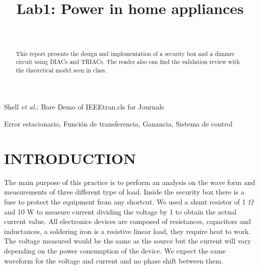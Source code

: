 \documentclass[journal]{IEEEtran}
\begin{document}
\title{\textbf{Lab1: Power in home appliances}}
\author{
  \\
}

%
{Shell \MakeLowercase{\textit{et al.}}: Bare Demo of IEEEtran.cls 
for Journals}
	
\maketitle

\begin{abstract}
This report presents the design and implementation of a security box 
and a dimmer circuit using DIACs and TRIACs. The reader also can find 
the validation review with the theoretical model seen in class.    
\end{abstract}


\begin{IEEEkeywords}  
Error estacionario, Funci\'on de transferencia, 
Ganancia, Sistema de control  
\end{IEEEkeywords}


\IEEEpeerreviewmaketitle

\section{INTRODUCTION}

The main purpose of this practice is to perform an analysis on the 
wave form and measurements of three different type of load. Inside the 
security box there is a fuse to protect the equipment from any 
shortcut. We used a shunt resistor of 1 $\Omega$ and 10 W to measure 
current dividing the voltage by 1 to obtain the actual current value.
All electronics devices are composed of resistances, capacitors and 
inductances, a soldering iron is a resistive linear load, they require 
heat to work. The voltage measured would be the same as the source but 
the current will vary depending on the power consumption of the 
device. We expect the same waveform for the voltage and current and no 
phase shift between them.\\
\end{document}
